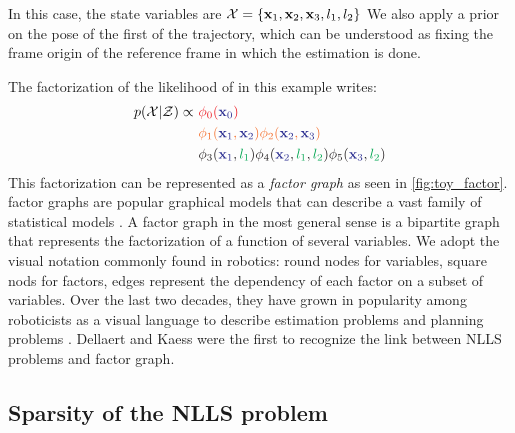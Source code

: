 In this case, the state variables are $\mathcal{X} = \{ {\bf x}_1, {\bf x}_2, {\bf x}_3, l_1, l_2\}$ %
We also apply a prior on the pose of the first \keyframe of the trajectory, which can be understood as fixing the frame origin of the reference 
frame in which the estimation is done.

The factorization of the likelihood of  in this example writes:
%
\begin{align}
    p(\cX | \cZ) \propto 
    ~&{\color{Red} \phi_0({\color{Blue} \bfx_{0}})} \\ 
    ~&{\color{Orange} \phi_1({\color{Blue} \bfx_1}, {\color{Blue} \bfx_2}) \phi_2({\color{Blue} \bfx_2}, {\color{Blue} \bfx_3})} \\ 
    ~&{\color{Black} \phi_3({\color{Blue} \bfx_1}, {\color{Green} l_1}) \phi_4({\color{Blue} \bfx_2}, {\color{Green} l_1}, {\color{Green} l_2}) \phi_5({\color{Blue} \bfx_3}, {\color{Green} l_2})} \\ 
\end{align}
%
This factorization can be represented as a \textit{factor graph} as seen in \ref{fig:toy_factor}. 
factor graphs are popular graphical models \cite{koller2009probabilistic} that can describe a vast family of statistical models \cite{loeliger2004introduction}.
A factor graph in the most general sense is a bipartite graph that represents the factorization of a function of several variables. 
We adopt the visual notation commonly found in robotics: round nodes for variables, square nods for factors, edges represent the dependency 
of each factor on a subset of variables. Over the last two decades, they have grown in popularity among roboticists as a visual language to describe 
estimation problems \cite{dellaert2017factor} and planning problems \cite{dong2016motion}. Dellaert and Kaess \cite{dellaert2006square} were the first to
recognize the link between NLLS problems and factor graph.


\subsection{Sparsity of the NLLS problem}













